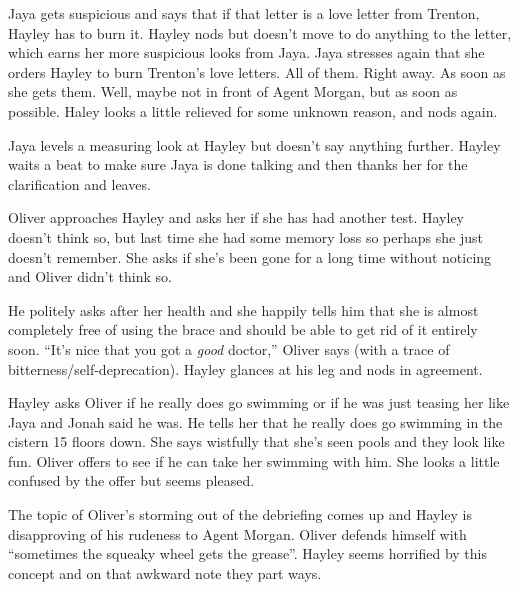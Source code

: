 Jaya gets suspicious and says that if that letter is a love letter from Trenton, Hayley has to burn it.  Hayley nods but doesn't move to do anything to the letter, which earns her more suspicious looks from Jaya.  Jaya stresses again that she orders Hayley to burn Trenton's love letters.  All of them.  Right away.  As soon as she gets them.  Well, maybe not in front of Agent Morgan, but as soon as possible.  Haley looks a little relieved for some unknown reason, and nods again.



Jaya levels a measuring look at Hayley but doesn't say anything further.  Hayley waits a beat to make sure Jaya is done talking and then thanks her for the clarification and leaves.



Oliver approaches Hayley and asks her if she has had another test.  Hayley doesn't think so, but last time she had some memory loss so perhaps she just doesn't remember.  She asks if she's been gone for a long time without noticing and Oliver didn't think so.



He politely asks after her health and she happily tells him that she is almost completely free of using the brace and should be able to get rid of it entirely soon.  ``It's nice that you got a \textit{good }doctor,'' Oliver says (with a trace of bitterness/self-deprecation).  Hayley glances at his leg and nods in agreement.



Hayley asks Oliver if he really does go swimming or if he was just teasing her like Jaya and Jonah said he was.  He tells her that he really does go swimming in the cistern 15 floors down. She says wistfully that she's seen pools and they look like fun.  Oliver offers to see if he can take her swimming with him.  She looks a little confused by the offer but seems pleased.



The topic of Oliver's storming out of the debriefing comes up and Hayley is disapproving of his rudeness to Agent Morgan.  Oliver defends himself with ``sometimes the squeaky wheel gets the grease''.  Hayley seems horrified by this concept and on that awkward note they part ways.



